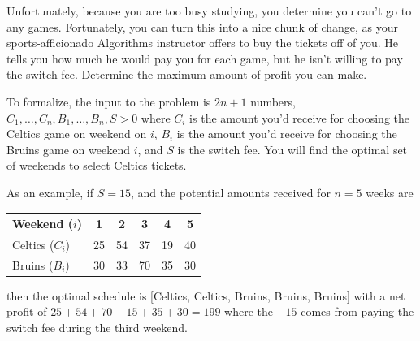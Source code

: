 \documentclass[11pt]{article}
\theoremstyle{definition}
\theoremstyle{theorem}
\begin{document}
Unfortunately, because you are too busy studying, you determine you can't go to any games. Fortunately, you can turn this into a nice chunk of change, as your sports-afficionado Algorithms instructor offers to buy the tickets off of you. He tells you how much he would pay you for each game, but he isn't willing to pay the switch fee. Determine the maximum amount of profit you can make.

To formalize, the input to the problem is $2n+1$ numbers, $C_1, \dots, C_n, B_1, \dots, B_n,S>0$ where $C_i$ is the amount you'd receive for choosing the Celtics game on weekend on $i$, $B_i$ is the amount you'd receive for choosing the Bruins game on weekend $i$, and $S$ is the switch fee. You will find the optimal set of weekends to select Celtics tickets.

As an example, if $S=15$, and the potential amounts received for $n=5$ weeks are

\begin{center}
\begin{tabular}{|l|c|c|c|c|c|}
\hline
Weekend ($i$) & 1 & 2 & 3 & 4 & 5 \\
\hline
Celtics ($C_i$) & 25 & 54 & 37 & 19 & 40 \\
Bruins ($B_i$) & 30 & 33 & 70 & 35 & 30 \\
\hline
\end{tabular}
\end{center}

then the optimal schedule is [Celtics, Celtics, Bruins, Bruins, Bruins] with a net profit of $25 +54 +70 - 15 +35 +30 = 199$ where the $-15$ comes from paying the switch fee during the third weekend.
\end{document}
